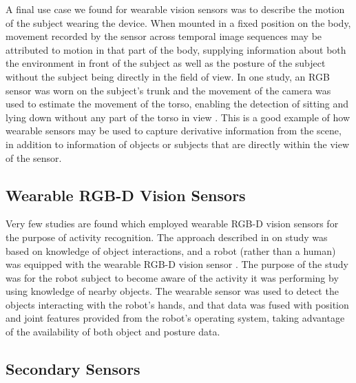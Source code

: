 \documentclass[12pt]{report}
\begin{document}
A final use case we found for wearable vision sensors was to describe the motion of the subject wearing the device. When mounted in a fixed position on the body, movement recorded by the sensor across temporal image sequences may be attributed to motion in that part of the body, supplying information about both the environment in front of the subject as well as the posture of the subject without the subject being directly in the field of view. In one study, an RGB sensor was worn on the subject’s trunk and the movement of the camera was used to estimate the movement of the torso, enabling the detection of sitting and lying down without any part of the torso in view \cite{Mahabalagiri2013}. This is a good example of how wearable sensors may be used to capture derivative information from the scene, in addition to information of objects or subjects that are directly within the view of the sensor.

\subsection{Wearable RGB-D Vision Sensors}

Very few studies are found which employed wearable RGB-D vision sensors for the purpose of activity recognition. The approach described in on study was based on knowledge of object interactions, and a robot (rather than a human) was equipped with the wearable RGB-D vision sensor \cite{Li2016}. The purpose of the study was for the robot subject to become aware of the activity it was performing by using knowledge of nearby objects. The wearable sensor was used to detect the objects interacting with the robot’s hands, and that data was fused with position and joint features provided from the robot’s operating system, taking advantage of the availability of both object and posture data. 

\subsection{Secondary Sensors}
\end{document}

